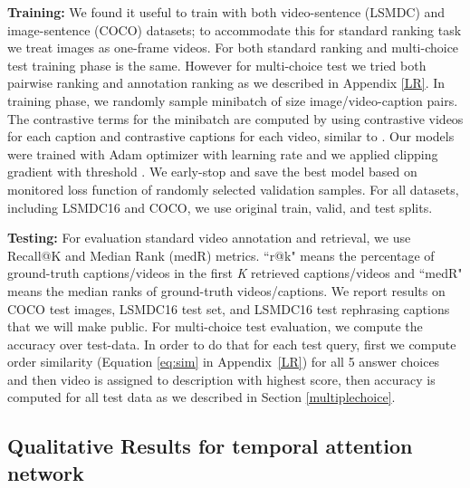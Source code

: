 \documentclass[runningheads]{llncs}
\begin{document}
\noindent
{\bf Training:} 
We found it useful to train with both video-sentence (LSMDC) and image-sentence (COCO) datasets; to accommodate this for standard ranking task we treat images as one-frame videos. For both standard ranking and multi-choice test training phase is the same. However for multi-choice test we tried both pairwise ranking and annotation ranking as we described in Appendix \ref{LR}. In training phase, we randomly sample minibatch of size  image/video-caption pairs. The contrastive terms for the minibatch are computed by using  contrastive videos for each caption and  contrastive captions for each video, similar to \cite{IvanVendrov2015}. Our models were trained with Adam optimizer with learning rate  and we applied clipping gradient with threshold . We early-stop and save the best model based on monitored loss function of  randomly selected validation samples. For all datasets, including LSMDC16 and COCO, we use original train, valid, and test splits.   

{\bf Testing:} For evaluation standard video annotation and retrieval, we use Recall@K and Median Rank (medR) metrics. ``r@k" means the percentage of ground-truth captions/videos in the first \textit{K} retrieved captions/videos and ``medR" means the median ranks of ground-truth videos/captions. We report results on COCO test images, LSMDC16  test set, and LSMDC16 test rephrasing captions that we will make public. For multi-choice test evaluation, we compute the accuracy over test-data. In order to do that for each test query, first we compute order similarity (Equation \ref{eq:sim} in Appendix~\ref{LR}) for all 5 answer choices and then video is assigned to description with highest score, then accuracy is computed for all test data as we described in Section \ref{multiplechoice}.

\subsection{Qualitative Results for temporal attention network}
\label{qualitative}
\end{document}

